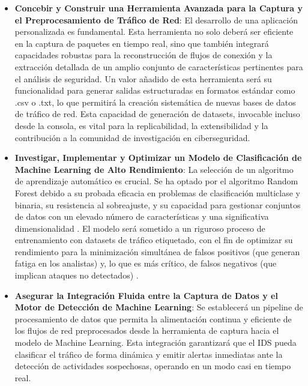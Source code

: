 \begin{itemize}

    \item\textbf{Concebir y Construir una Herramienta Avanzada para la Captura y el Preprocesamiento de Tráfico de Red}: El desarrollo de una aplicación personalizada es fundamental. Esta herramienta no solo deberá ser eficiente en la captura de paquetes en tiempo real, sino que también integrará capacidades robustas para la reconstrucción de flujos de conexión y la extracción detallada de un amplio conjunto de características pertinentes para el análisis de seguridad. Un valor añadido de esta herramienta será su funcionalidad para generar salidas estructuradas en formatos estándar como .csv o .txt, lo que permitirá la creación sistemática de nuevas bases de datos de tráfico de red. Esta capacidad de generación de datasets, invocable incluso desde la consola, es vital para la replicabilidad, la extensibilidad y la contribución a la comunidad de investigación en ciberseguridad.
    
    \item\textbf{Investigar, Implementar y Optimizar un Modelo de Clasificación de Machine Learning de Alto Rendimiento}: La selección de un algoritmo de aprendizaje automático es crucial. Se ha optado por el algoritmo Random Forest debido a su probada eficacia en problemas de clasificación multiclase y binaria, su resistencia al sobreajuste, y su capacidad para gestionar conjuntos de datos con un elevado número de características y una significativa dimensionalidad \cite{Breiman2001RandomForests}. El modelo será sometido a un riguroso proceso de entrenamiento con datasets de tráfico etiquetado, con el fin de optimizar su rendimiento para la minimización simultánea de falsos positivos (que generan fatiga en los analistas) y, lo que es más crítico, de falsos negativos (que implican ataques no detectados) \cite{PolaniaArias2021EvaluacionMLIDS}.
    
    \item\textbf{Asegurar la Integración Fluida entre la Captura de Datos y el Motor de Detección de Machine Learning}: Se establecerá un pipeline de procesamiento de datos que permita la alimentación continua y eficiente de los flujos de red preprocesados desde la herramienta de captura hacia el modelo de Machine Learning. Esta integración garantizará que el IDS pueda clasificar el tráfico de forma dinámica y emitir alertas inmediatas ante la detección de actividades sospechosas, operando en un modo casi en tiempo real.
    

\end{itemize}
